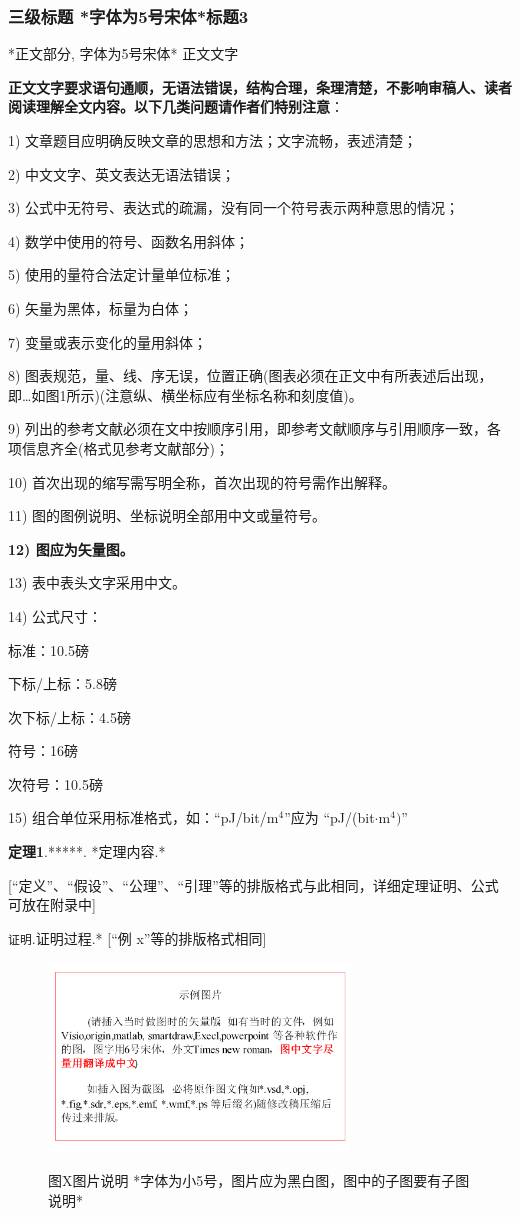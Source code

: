 \documentclass[10.5pt,compsoc,UTF8]{CjC}
\theoremstyle{mystyle}
\begin{document}
\begin{multicols}{1}
\subsubsection{三级标题 *字体为5号宋体*标题3}
*正文部分, 字体为5号宋体* 正文文字

\textbf{正文文字要求语句通顺，无语法错误，结构合理，条理清楚，不影响审稿人、读者阅读理解全文内容。以下几类问题请作者们特别注意}：

1) 文章题目应明确反映文章的思想和方法；文字流畅，表述清楚；

2) 中文文字、英文表达无语法错误；

3) 公式中无符号、表达式的疏漏，没有同一个符号表示两种意思的情况；

4) 数学中使用的符号、函数名用斜体；

5) 使用的量符合法定计量单位标准；

6) 矢量为黑体，标量为白体；

7) 变量或表示变化的量用斜体；

8) 图表规范，量、线、序无误，位置正确(图表必须在正文中有所表述后出现，即{\ldots}如图1所示)(注意纵、横坐标应有坐标名称和刻度值)。

9) 列出的参考文献必须在文中按顺序引用，即参考文献顺序与引用顺序一致，各项信息齐全(格式见参考文献部分)；

10) 首次出现的缩写需写明全称，首次出现的符号需作出解释。

11) 图的图例说明、坐标说明全部用中文或量符号。

\textbf{12) 图应为矢量图。}

13) 表中表头文字采用中文。

14) 公式尺寸：

标准：10.5磅

下标/上标：5.8磅

次下标/上标：4.5磅

符号：16磅

次符号：10.5磅

15) 组合单位采用标准格式，如：``pJ/bit/m$^{4}$''应为 ``pJ/(bit$\cdot
$m$^{4})$''

\textbf{定理1}.\quad ******. *定理内容.*

[``定义''、``假设''、``公理''、``引理''等的排版格式与此相同，详细定理证明、公式可放在附录中]

\texttt{证明}.\quad  *证明过程.* [``例 x''等的排版格式相同]


\begin{figure}[H]
\centerline{\includegraphics[width=3.15in,height=1.98in]{CJC1.pdf}}
{图X\quad  图片说明 *字体为小5号，图片应为黑白图，图中的子图要有子图说明*}
\label{fig1}
\end{figure}


\end{multicols}
\end{document}
